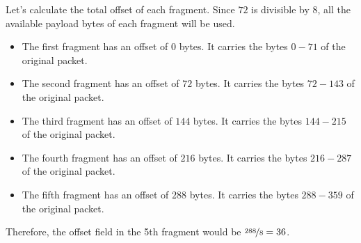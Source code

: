 \documentclass[12pt]{article}
\begin{document}
\begin{ejercicio}[20 points]
\begin{enumerate}[label=\alph*)]
            Let's calculate the total offset of each fragment. Since $72$ is divisible by $8$, all the available payload bytes of each fragment will be used.
            \begin{itemize}
                \item The first fragment has an offset of $0$ bytes. It carries the bytes $0-71$ of the original packet.
                \item The second fragment has an offset of $72$ bytes. It carries the bytes $72-143$ of the original packet.
                \item The third fragment has an offset of $144$ bytes. It carries the bytes $144-215$ of the original packet.
                \item The fourth fragment has an offset of $216$ bytes. It carries the bytes $216-287$ of the original packet.
                \item The fifth fragment has an offset of $288$ bytes. It carries the bytes $288-359$ of the original packet.
            \end{itemize}

            Therefore, the offset field in the 5th fragment would be $\nicefrac{288}{8} = 36$.
        \end{enumerate}
    \end{ejercicio}

    \newpage
\end{document}

